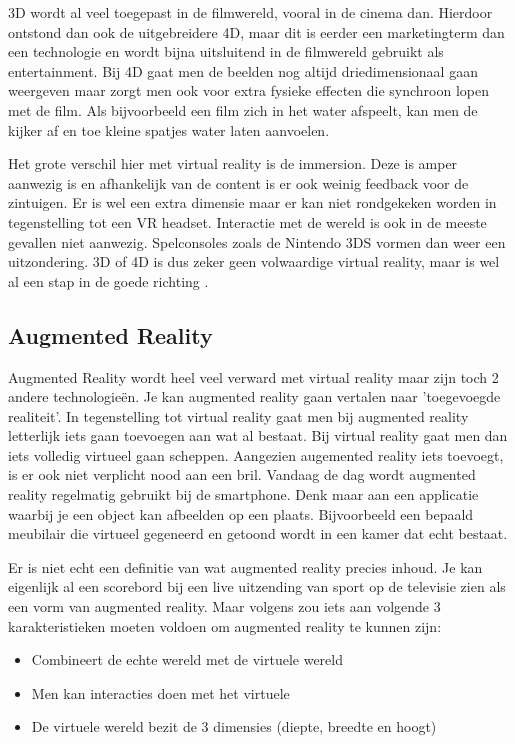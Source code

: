 3D wordt al veel toegepast in de filmwereld, vooral in de cinema dan. Hierdoor ontstond dan ook de uitgebreidere 4D, maar dit is eerder een marketingterm dan een technologie en wordt bijna uitsluitend in de filmwereld gebruikt als entertainment. Bij 4D gaat men de beelden nog altijd driedimensionaal gaan weergeven maar zorgt men ook voor extra fysieke effecten die synchroon lopen met de film. Als bijvoorbeeld een film zich in het water afspeelt, kan men de kijker af en toe kleine spatjes water laten aanvoelen.

Het grote verschil hier met virtual reality is de immersion. Deze is amper aanwezig is en afhankelijk van de content is er ook weinig feedback voor de zintuigen. Er is wel een extra dimensie maar er kan niet rondgekeken worden in tegenstelling tot een VR headset. Interactie met de wereld is ook in de meeste gevallen niet aanwezig. Spelconsoles zoals de Nintendo 3DS vormen dan weer een uitzondering. 3D of 4D is dus zeker geen volwaardige virtual reality, maar is wel al een stap in de goede richting \autocite{Peniche2016}.

\subsection{Augmented Reality}
\label{subsec:augmented-reality}
Augmented Reality wordt heel veel verward met virtual reality maar zijn toch 2 andere technologieën. Je kan augmented reality gaan vertalen naar 'toegevoegde realiteit'. In tegenstelling tot virtual reality gaat men bij augmented reality letterlijk iets gaan toevoegen aan wat al bestaat. Bij virtual reality gaat men dan iets volledig virtueel gaan scheppen. Aangezien augemented reality iets toevoegt, is er ook niet verplicht nood aan een bril. Vandaag de dag wordt augmented reality regelmatig gebruikt bij de smartphone. Denk maar aan een applicatie waarbij je een object kan afbeelden op een plaats. Bijvoorbeeld een bepaald meubilair die virtueel gegeneerd en getoond wordt in een kamer dat echt bestaat.

Er is niet echt een definitie van wat augmented reality precies inhoud. Je kan eigenlijk al een scorebord bij een live uitzending van sport op de televisie zien als een vorm van augmented reality. Maar volgens \autocite{Azuma1997} zou iets aan volgende 3 karakteristieken moeten voldoen om augmented reality te kunnen zijn:

\begin{itemize}
	\item Combineert de echte wereld met de virtuele wereld
	\item Men kan interacties doen met het virtuele
	\item De virtuele wereld bezit de 3 dimensies (diepte, breedte en hoogt)
\end{itemize}

